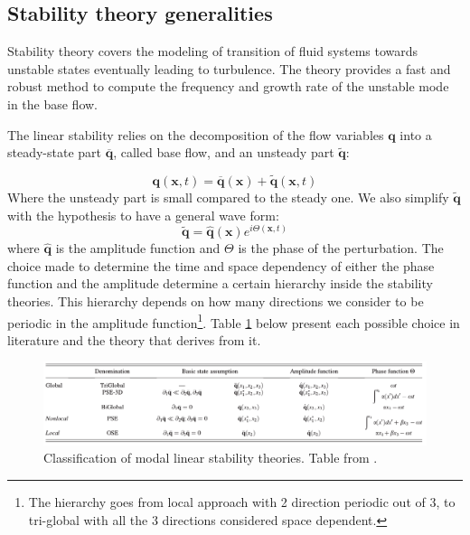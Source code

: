 \subsection{Stability theory generalities}

Stability theory covers the modeling of transition of fluid systems towards unstable states eventually leading to turbulence.
The theory provides a fast and robust method to compute the frequency and growth rate of the unstable mode in the base flow.

The linear stability relies on the decomposition of the flow variables $\mathbf{q}$ into a steady-state part $\overline{\mathbf{q}}$, called base flow, and an unsteady part $\widetilde{\mathbf{q}}$:

$$ \mathbf{q} (\mathbf{x},t)= \overline{\mathbf{q}} (\mathbf{x}) + \widetilde{\mathbf{q}} (\mathbf{x},t) $$
Where the unsteady part is small compared to the steady one. We also simplify $\widetilde{\mathbf{q}}$ with the hypothesis to have a general wave form:
$$  \widetilde{\mathbf{q}} =  \widehat{\mathbf{q}}(\mathbf{x}) e^{i\Theta(\mathbf{x},t)} $$
where $\widehat{\mathbf{q}}$ is the amplitude function and $\Theta$ is the phase of the perturbation.
The choice made to determine the time and space dependency of either the phase function and the amplitude determine a certain hierarchy inside the stability theories. This hierarchy depends on how many directions we consider to be periodic in the amplitude function\footnote{The hierarchy goes from local approach with 2 direction periodic out of 3, to tri-global with all the 3 directions considered space dependent.}.
Table \ref{fig:table} below present each possible choice in literature and the theory that derives from it.

\begin{figure}[h]
	\centering
	\includegraphics[width=1\linewidth]{chapter_1/table}
	\caption{Classification of modal linear stability theories. Table from \citet{juniper2014modal}.}
	\label{fig:table}
\end{figure}
 
